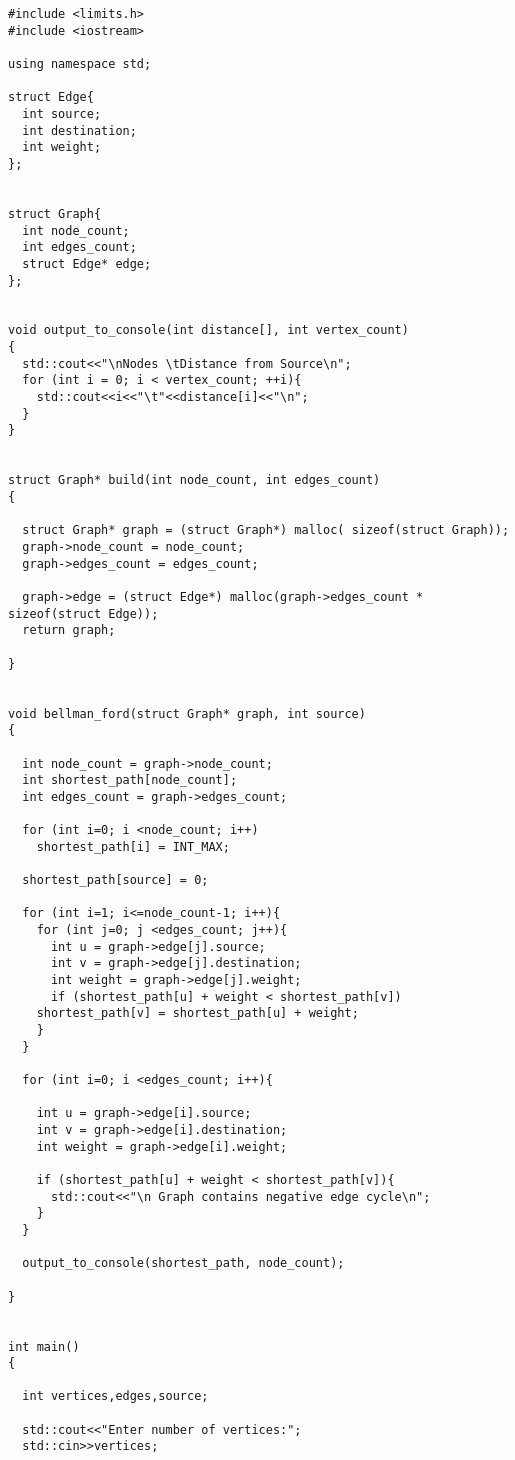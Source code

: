 \documentclass{article}
\begin{document}
\begin{verbatim}
#include <limits.h>
#include <iostream>
 
using namespace std;
 
struct Edge{
  int source;
  int destination;
  int weight;
};


struct Graph{
  int node_count;
  int edges_count;
  struct Edge* edge;
};


void output_to_console(int distance[], int vertex_count)
{
  std::cout<<"\nNodes \tDistance from Source\n";
  for (int i = 0; i < vertex_count; ++i){
    std::cout<<i<<"\t"<<distance[i]<<"\n";
  }
}


struct Graph* build(int node_count, int edges_count)
{
  
  struct Graph* graph = (struct Graph*) malloc( sizeof(struct Graph));
  graph->node_count = node_count;
  graph->edges_count = edges_count;
 
  graph->edge = (struct Edge*) malloc(graph->edges_count * sizeof(struct Edge));
  return graph;
  
}


void bellman_ford(struct Graph* graph, int source)
{
  
  int node_count = graph->node_count;
  int shortest_path[node_count];
  int edges_count = graph->edges_count;
 
  for (int i=0; i <node_count; i++)
    shortest_path[i] = INT_MAX;
 
  shortest_path[source] = 0;
 
  for (int i=1; i<=node_count-1; i++){
    for (int j=0; j <edges_count; j++){
      int u = graph->edge[j].source;
      int v = graph->edge[j].destination;
      int weight = graph->edge[j].weight;
      if (shortest_path[u] + weight < shortest_path[v])
	shortest_path[v] = shortest_path[u] + weight;
    }
  }
 
  for (int i=0; i <edges_count; i++){
    
    int u = graph->edge[i].source;
    int v = graph->edge[i].destination;
    int weight = graph->edge[i].weight;
    
    if (shortest_path[u] + weight < shortest_path[v]){
      std::cout<<"\n Graph contains negative edge cycle\n";
    }
  }
 
  output_to_console(shortest_path, node_count);
  
}


int main()
{
  
  int vertices,edges,source;
 
  std::cout<<"Enter number of vertices:";
  std::cin>>vertices;
  

\end{verbatim}
\end{document}
